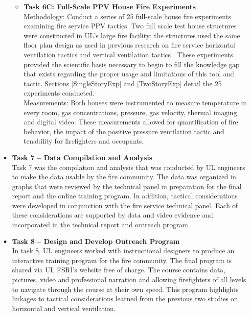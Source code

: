 \documentclass{article}
\begin{document}
\begin{itemize}
\begin{itemize}
		\item \textbf{Task 6C: Full-Scale PPV House Fire Experiments} \\
		Methodology: Conduct a series of 25 full-scale house fire experiments examining fire service PPV tactics. Two full scale test house structures were constructed in UL’s large fire facility; the structures used the same floor plan design as used in previous research on fire service horizontal ventilation tactics \cite{DHS2008} and vertical ventilation tactics \cite{DHS2010}. These experiments provided the scientific basis necessary to begin to fill the knowledge gap that exists regarding the proper usage and limitations of this tool and tactic. Sections \ref{SingleStoryExp} and \ref{TwoStoryExp} detail the 25 experiments conducted.\\
		\vspace*{\baselineskip}
		Measurements: Both houses were instrumented to measure temperature in every room, gas concentrations, pressure, gas velocity, thermal imaging and digital video. These measurements allowed for quantification of fire behavior, the impact of the positive pressure ventilation tactic and tenability for firefighters and occupants.
	\end{itemize}
	\item \textbf{Task 7 – Data Compilation and Analysis} \\
	Task 7 was the compilation and analysis that was conducted by UL engineers to make the data usable by the fire community. The data was organized in graphs that were reviewed by the technical panel in preparation for the final report and the online training program. In addition, tactical considerations were developed in conjunction with the fire service technical panel. Each of these considerations are supported by data and video evidence and incorporated in the technical report and outreach program.
	
	\item \textbf{Task 8 – Design and Develop Outreach Program} \\
	In task 8, UL engineers worked with instructional designers to produce an interactive training program for the fire community. The final program is shared via UL FSRI's website free of charge.  The course contains data, pictures, video and professional narration and allowing firefighters of all levels to navigate through the course at their own speed. This program highlights linkages to tactical considerations learned from the previous two studies on horizontal and vertical ventilation.
	

\end{itemize}
\end{document}
